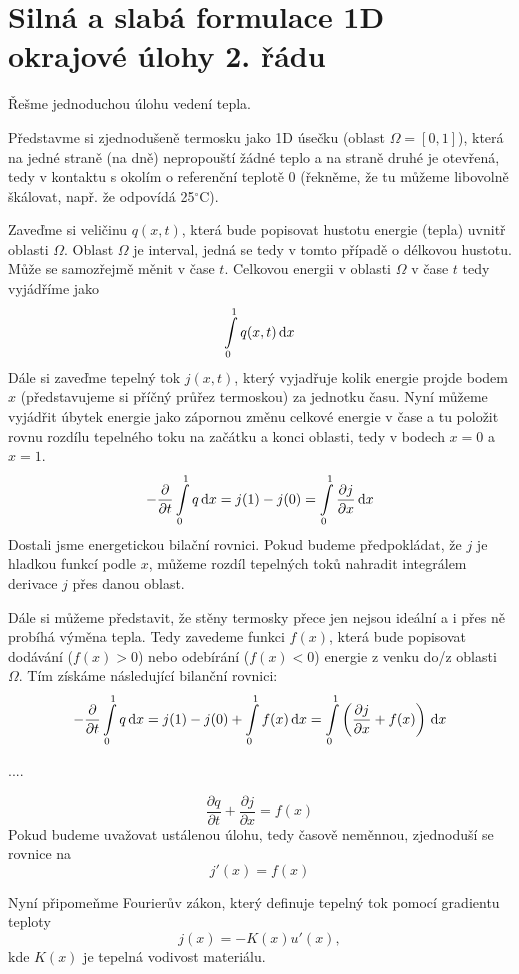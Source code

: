 \section{Silná a slabá formulace 1D okrajové úlohy 2. řádu}

Řešme jednoduchou úlohu vedení tepla. 

Představme si zjednodušeně termosku jako 1D úsečku (oblast $\Omega = [0,1]$),
která na jedné straně (na dně) nepropouští žádné teplo a na straně druhé je otevřená,
tedy v kontaktu s okolím o referenční teplotě 0 (řekněme, že tu můžeme libovolně škálovat, např. že odpovídá 25$^\circ$C).

Zaveďme si veličinu $q(x,t)$, která bude popisovat hustotu energie (tepla) uvnitř oblasti $\Omega$.
Oblast $\Omega$ je interval, jedná se tedy v tomto případě o délkovou hustotu.
Může se samozřejmě měnit v čase $t$.
Celkovou energii v oblasti $\Omega$ v čase $t$ tedy vyjádříme jako
\[
  \int\limits_0^1 q(x,t) \,{\rm d} x
\]
Dále si zaveďme tepelný tok $j(x,t)$, který vyjadřuje kolik energie projde bodem $x$ (představujeme si příčný průřez termoskou)
za jednotku času.
Nyní můžeme vyjádřit úbytek energie jako zápornou změnu celkové energie v čase a tu položit rovnu rozdílu tepelného toku
na začátku a konci oblasti, tedy v bodech $x=0$ a $x=1$.
\[
  -\frac{\partial}{\partial t}\int\limits_0^1 q \,{\rm d} x = j(1) - j(0) = \int\limits_0^1 \frac{\partial j}{\partial x} \,{\rm d} x
\]
Dostali jsme energetickou bilační rovnici. Pokud budeme předpokládat, že $j$ je hladkou funkcí podle $x$, můžeme rozdíl tepelných toků nahradit 
integrálem derivace $j$ přes danou oblast.

Dále si můžeme představit, že stěny termosky přece jen nejsou ideální a i přes ně probíhá výměna tepla.
Tedy zavedeme funkci $f(x)$, která bude popisovat dodávání ($f(x)>0$) nebo odebírání ($f(x)<0$) energie z venku do/z oblasti $\Omega$.
Tím získáme následující bilanční rovnici:
\[
  -\frac{\partial}{\partial t}\int\limits_0^1 q \,{\rm d} x = j(1) - j(0) + \int\limits_0^1 f(x) \,{\rm d} x= \int\limits_0^1 \left(\frac{\partial j}{\partial x} + f(x) \right) \,{\rm d} x
\]

....

\[
  \frac{\partial q}{\partial t} + \frac{\partial j}{\partial x} = f(x)
\]
Pokud budeme uvažovat ustálenou úlohu, tedy časově neměnnou, zjednoduší se rovnice na
\begin{equation}
  j'(x) = f(x) \label{eqn:continuity_steady_1d}
\end{equation}

Nyní připomeňme Fourierův zákon, který definuje tepelný tok pomocí gradientu teploty
\begin{equation}
j(x) = -K(x)u'(x), \label{eqn:fourier_1d}
\end{equation}
kde $K(x)$ je tepelná vodivost materiálu.


